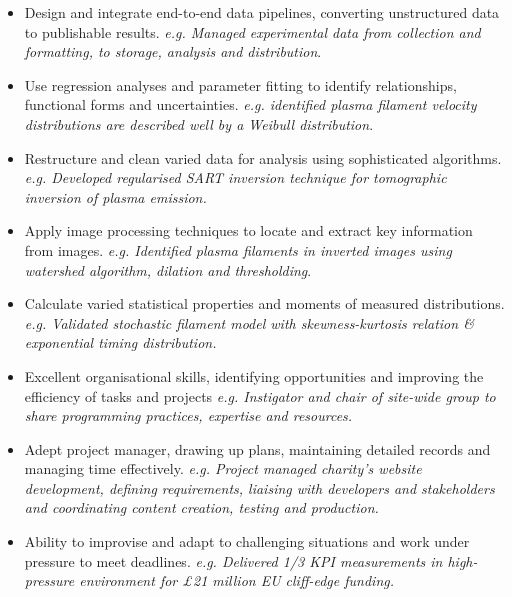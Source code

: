 \documentclass[12pt,a4paper,sans]{moderncv}        %
\begin{document}
{\begin{itemize}%
\item Design and integrate end-to-end \textcolor{mypurple}{data pipelines}, converting \textcolor{mypurple}{unstructured data} to publishable results.
\newline
\textit{e.g. Managed experimental data from collection and formatting, to storage, analysis and distribution}.
\item Use \textcolor{mypurple}{regression analyses} and \textcolor{mypurple}{parameter fitting} to identify relationships, functional forms and  uncertainties. \newline
\textit{e.g. identified plasma filament velocity distributions are described well by a Weibull distribution}.
\item \textcolor{mypurple}{Restructure} and \textcolor{mypurple}{clean} varied data for analysis using sophisticated algorithms. \newline
\textit{e.g. Developed regularised SART inversion technique for tomographic inversion of plasma emission.}
\item Apply \textcolor{mypurple}{image processing} techniques to locate and extract key information from images. \newline
\textit{e.g. Identified plasma filaments in inverted images using watershed algorithm, dilation and thresholding}.
\item Calculate varied \textcolor{mypurple}{statistical properties} and moments of measured \textcolor{mypurple}{distributions}.\newline
\textit{e.g. Validated stochastic filament model with skewness-kurtosis relation \& exponential timing distribution.}
\end{itemize}}

{\begin{itemize}%
\item Excellent organisational skills, \textcolor{mypurple}{identifying opportunities} and improving the \textcolor{mypurple}{efficiency} of tasks and projects\newline
\textit{e.g. Instigator and chair of site-wide group to share programming practices, expertise and resources.} %
\item Adept \textcolor{mypurple}{project manager}, drawing up plans, maintaining detailed records and managing time effectively.\newline
\textit{e.g. Project managed charity's website development, defining requirements, liaising with developers and stakeholders and coordinating content creation, testing and production.}
\item Ability to improvise and \textcolor{mypurple}{adapt} to challenging situations and work under pressure to meet \textcolor{mypurple}{deadlines}. 
\newline
\textit{e.g. Delivered 1/3 KPI measurements in high-pressure environment for £21 million EU cliff-edge funding.}
\end{itemize}}
\end{document}
